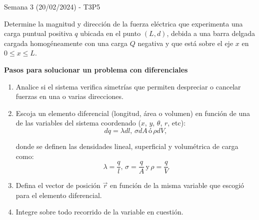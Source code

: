 \begin{frame}{Semana 3 (20/02/2024) - T3P5}
    
    Determine la magnitud y direcci\'on de la fuerza el\'ectrica que experimenta una carga puntual positiva $q$ ubicada en el punto $(L,d)$, debida a una barra delgada cargada homogéneamente con una carga $Q$ negativa y que est\'a sobre el eje $x$ en $0\leq x\leq L$.
    
\end{frame}

\begin{frame}{}

    \textbf{Pasos para solucionar un problema con diferenciales}

    \begin{enumerate}
        \item Analice si el sistema verifica simetrías que permiten despreciar o cancelar fuerzas en una o varias direcciones. 
        \item Escoja un elemento diferencial (longitud, área o volumen) en función de una de las variables del sistema coordenado ($x$, $y$, $\theta$, $r$, etc):
        \begin{equation*}
            dq = \lambda dl,\, \sigma dA\, \text{ó}\, \rho dV,
        \end{equation*}

        donde se definen las densidades lineal, superficial y volumétrica de carga como:
        \begin{equation*}
            \lambda = \frac{q}{l},\, \sigma = \frac{q}{A}\, \text{y}\, \rho = \frac{q}{V}
        \end{equation*}
        \item Defina el vector de posición $\vec{r}$ en función de la misma variable que escogió para el elemento diferencial.
        \item Integre sobre todo recorrido de la variable en cuestión.
    \end{enumerate}
    
\end{frame}

